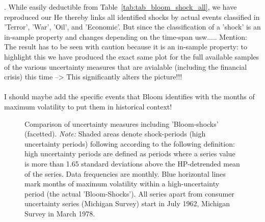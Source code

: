\documentclass[a4paper,11pt,listof=nochaptergap,oneside,pointednumbers,bibtotoc,bigheadings,liststotoc]{scrbook}
\theoremstyle{mysatz}
\theoremstyle{mydefinition}
\theoremstyle{mybemerkung}
\begin{document}
. While easily deductible from Table~\ref{tab:tab_bloom_shock_all}, we have reproduced our 
He thereby links all identified shocks by actual events classified in 'Terror', 'War', 'Oil', and 'Economic'. But since the classification of a 'shock' is an in-sample property and changes depending on the time-span usw.....
Mention: The result has to be seen with caution because it is an in-sample property: to highlight this we have produced the exact same plot for the full available samples of the various uncertainty measures that are avialable (including the financial crisis) this time --> This significantly alters the picture!!!\\
\\
I should maybe add the specific events that Bloom identifies with the months of maximum volatility to put them in historical context!

\begin{landscape}
\begin{figure}[!ht]
   \centering
   \setlength\fboxsep{0pt}
   \setlength\fboxrule{0pt}
      \caption[Comparison of uncertainty measures including 'Bloom-shocks' (facetted).]{Comparison of uncertainty measures including 'Bloom-shocks' (facetted).
      \textit{Note:} Shaded areas denote shock-periods (high uncertainty periods) following \citet{bloom:09} according to the following definition: high uncertainty periods are defined as periods where a series value is more than 1.65 standard deviations above the HP-detrended mean of the series. Data frequencies are monthly. Blue horizontal lines mark months of maximum volatility within a high-uncertainty period (the actual 'Bloom-Shocks'). All series apart from consumer uncertainty series (Michigan Survey) start in July 1962, Michigan Survey in March 1978.}   \label{fig:bloom_shock_all}
\end{figure}
\end{landscape}
\end{document}
